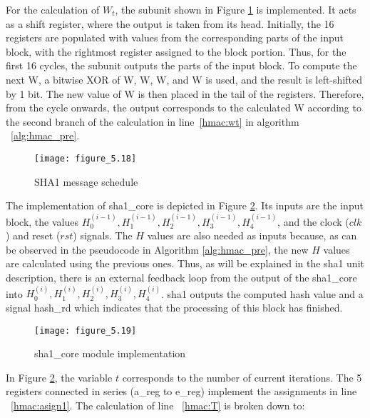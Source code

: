For the calculation of $W_t$, the subunit shown in Figure \ref{fig:figure_5.18} is implemented. It acts as a shift register, where the output is taken from its head. Initially, the 16 registers are populated with values from the corresponding parts of the input block, with the rightmost register assigned to the  block portion. Thus, for the first 16 cycles, the subunit outputs the parts of the input block. To compute the next W, a bitwise XOR of W, W, W, and W is used, and the result is left-shifted by 1 bit. The new value of W is then placed in the tail of the registers. Therefore, from the  cycle onwards, the output corresponds to the calculated W according to the second branch of the calculation in line~\ref{hmac:wt} in algorithm ~\ref{alg:hmac_pre}.

\begin{figure}[H]
\centering
\texttt{[image: figure\_5.18]}\\
\caption{ SHA1 message schedule }
\label{fig:figure_5.18}
\end{figure}


The implementation of sha1\_core is depicted in Figure \ref{fig:figure_5.19}. Its inputs are the input block, the values $H_0^{(i-1)}, H_1^{(i-1)}, H_2^{(i-1)}, H_3^{(i-1)}, H_4^{(i-1)}$, and the clock ($clk$) and reset ($rst$) signals. The $H$ values are also needed as inputs because, as can be observed in the pseudocode in Algorithm \ref{alg:hmac_pre}, the new $H$ values are calculated using the previous ones. Thus, as will be explained in the sha1 unit description, there is an external feedback loop from the output of the sha1\_core into $H_0^{(i)}, H_1^{(i)}, H_2^{(i)}, H_3^{(i)}, H_4^{(i)}$. sha1 outputs the computed hash value and a signal hash\_rd which indicates that the processing of this block has finished.

\begin{figure}[H]
\centering
\texttt{[image: figure\_5.19]}\\
\caption{ sha1\_core module implementation }
\label{fig:figure_5.19}
\end{figure}


In Figure \ref{fig:figure_5.19}, the variable $t$ corresponds to the number of current iterations. The 5 registers connected in series (a\_reg to e\_reg) implement the assignments in line ~\ref{hmac:asign1}. The calculation of line ~\ref{hmac:T} is broken down to:


